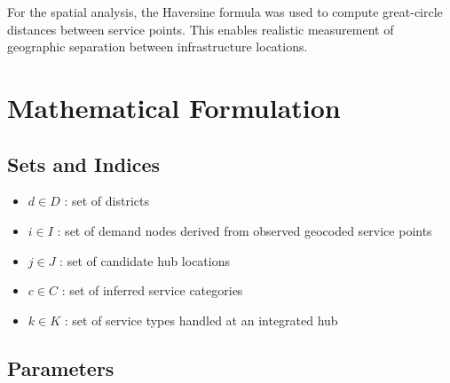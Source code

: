 For the spatial analysis, the Haversine formula was used to compute great-circle distances between service points. This enables realistic measurement of geographic separation between infrastructure locations.

\section{Mathematical Formulation}

\subsection{Sets and Indices}

\begin{itemize}
    \item $d \in D$ : set of districts
    \item $i \in I$ : set of demand nodes derived from observed geocoded service points
    \item $j \in J$ : set of candidate hub locations
    \item $c \in C$ : set of inferred service categories
    \item $k \in K$ : set of service types handled at an integrated hub
\end{itemize}

\subsection{Parameters}

